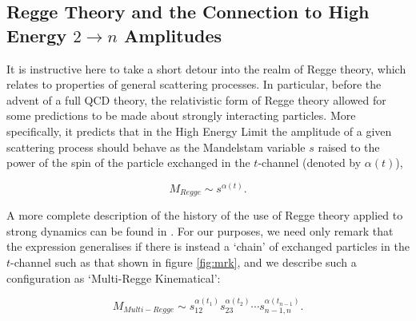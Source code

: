 \subsection{Regge Theory and the Connection to High Energy $2 \to n$ Amplitudes} 

It is instructive here to take a short detour into the realm of Regge theory, which relates to properties of general scattering processes. In particular, before the advent of a full QCD theory, the relativistic form of Regge theory allowed for some predictions to be made about strongly interacting particles. More specifically, it predicts that in the High Energy Limit the amplitude of a given scattering process should behave as the Mandelstam variable $s$ raised to the power of the spin of the particle exchanged in the $t$-channel (denoted by $\alpha(t)$),

\begin{equation}
M_{Regge} \sim s^{\alpha(t)}.
\end{equation}

A more complete description of the history of the use of Regge theory applied to strong dynamics can be found in \cite{pomeronbook}. For our purposes, we need only remark that the expression generalises if there is instead a `chain' of exchanged particles in the $t$-channel such as that shown in figure \ref{fig:mrk}, and we describe such a configuration as `Multi-Regge Kinematical': 

\begin{equation}
M_{Multi-Regge} \sim s_{12}^{\alpha(t_1)} s_{23}^{\alpha(t_2)} \cdots s_{n-1,n}^{\alpha(t_{n-1})}.
\end{equation}

